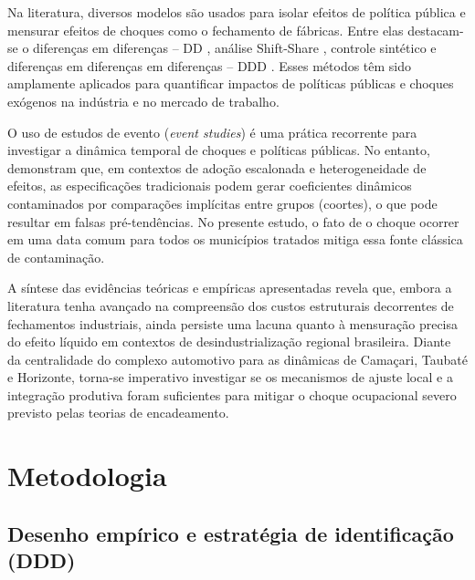 \documentclass[12pt,a4paper]{article}
\begin{document}
Na literatura, diversos modelos s\~ao usados para isolar efeitos de pol\'itica p\'ublica e mensurar efeitos de choques como o fechamento de f\'abricas. Entre elas destacam-se o diferen\c{c}as em diferen\c{c}as -- DD \parencite{venkataramani2020}, an\'alise Shift-Share \parencite{henriques2024}, controle sint\'etico \parencite{jofremonseny2018} e diferen\c{c}as em diferen\c{c}as em diferen\c{c}as -- DDD \parencite{demir2022}. Esses m\'etodos t\^em sido amplamente aplicados para quantificar impactos de pol\'iticas p\'ublicas e choques ex\'ogenos na ind\'ustria e no mercado de trabalho.

O uso de estudos de evento (\textit{event studies}) \'e uma pr\'atica recorrente para investigar a din\^amica temporal de choques e pol\'iticas p\'ublicas. No entanto, \textcite{sun2021} demonstram que, em contextos de ado\c{c}\~ao escalonada e heterogeneidade de efeitos, as especifica\c{c}\~oes tradicionais podem gerar coeficientes din\^amicos contaminados por compara\c{c}\~oes impl\'icitas entre grupos (coortes), o que pode resultar em falsas pr\'e-tend\^encias. No presente estudo, o fato de o choque ocorrer em uma data comum para todos os munic\'ipios tratados mitiga essa fonte cl\'assica de contamina\c{c}\~ao.

A s\'intese das evid\^encias te\'oricas e emp\'iricas apresentadas revela que, embora a literatura tenha avan\c{c}ado na compreens\~ao dos custos estruturais decorrentes de fechamentos industriais, ainda persiste uma lacuna quanto \`a mensura\c{c}\~ao precisa do efeito l\'iquido em contextos de desindustrializa\c{c}\~ao regional brasileira. Diante da centralidade do complexo automotivo para as din\^amicas de Cama\c{c}ari, Taubat\'e e Horizonte, torna-se imperativo investigar se os mecanismos de ajuste local e a integra\c{c}\~ao produtiva foram suficientes para mitigar o choque ocupacional severo previsto pelas teorias de encadeamento.

\section{Metodologia}
\label{sec:metodo}

\subsection{Desenho emp\'irico e estrat\'egia de identifica\c{c}\~ao (DDD)}
\label{sub:ddd}
\end{document}

